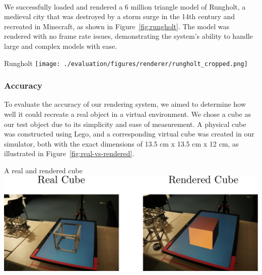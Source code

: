 \begin{invisBox}  
	\hfill
	\\[0.3cm]
	\hfill
\end{invisBox}

We successfully loaded and rendered a 6 million triangle model of Rungholt, a medieval city that was destroyed by a storm surge in the 14th century and recreated in Minecraft, as shown in Figure~\ref{fig:rungholt}. The model was rendered with no frame rate issues, demonstrating the system's ability to handle large and complex models with ease.

\begin{figureBox}[label={fig:rungholt}, width=0.8\linewidth]{Rungholt \cite{McGuire2017Data}}
	\texttt{[image: ./evaluation/figures/renderer/rungholt\_cropped.png]}
\end{figureBox}

\subsubsection{Accuracy}

To evaluate the accuracy of our rendering system, we aimed to determine how well it could recreate a real object in a virtual environment. We chose a cube as our test object due to its simplicity and ease of measurement. A physical cube was constructed using Lego, and a corresponding virtual cube was created in our simulator, both with the exact dimensions of 13.5 cm x 13.5 cm x 12 cm, as illustrated in Figure~\ref{fig:real-vs-rendered}.

\begin{figureBox}[label={fig:real-vs-rendered}, width=0.8\linewidth]{A real and rendered cube}
	\includegraphics[width = 1.0\linewidth]{./evaluation/figures/real-vs-rendered.pdf}
\end{figureBox}

